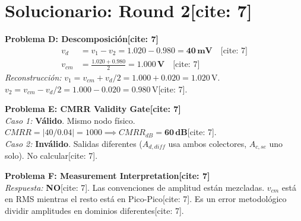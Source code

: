 \documentclass[11pt, a4paper]{article}
\begin{document}
\section*{Solucionario: Round 2[cite: 7]}

\textbf{Problema D: Descomposición[cite: 7]}
\begin{align*}
    v_d &= v_1 - v_2 = 1.020 - 0.980 = \mathbf{40\,\text{mV}} \quad \text{[cite: 7]} \\
    v_{cm} &= \frac{1.020 + 0.980}{2} = \mathbf{1.000\,\text{V}} \quad \text{[cite: 7]}
\end{align*}
\textit{Reconstrucción:} $v_1 = v_{cm} + v_d/2 = 1.000 + 0.020 = 1.020\,\text{V}$. $v_2 = v_{cm} - v_d/2 = 1.000 - 0.020 = 0.980\,\text{V}$[cite: 7].

\vspace{0.2cm}
\textbf{Problema E: CMRR Validity Gate[cite: 7]} \\
\textit{Caso 1:} \textbf{Válido}. Mismo nodo físico. $CMRR = |40 / 0.04| = 1000 \implies CMRR_{dB} = \mathbf{60\,\text{dB}}$[cite: 7]. \\
\textit{Caso 2:} \textbf{Inválido}. Salidas diferentes ($A_{d,diff}$ usa ambos colectores, $A_{c,se}$ uno solo). No calcular[cite: 7].

\vspace{0.2cm}
\textbf{Problema F: Measurement Interpretation[cite: 7]} \\
\textit{Respuesta:} \textbf{NO}[cite: 7]. Las convenciones de amplitud están mezcladas. $v_{cm}$ está en RMS mientras el resto está en Pico-Pico[cite: 7]. Es un error metodológico dividir amplitudes en dominios diferentes[cite: 7].
\end{document}
